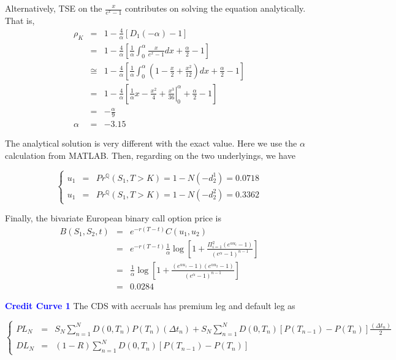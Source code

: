 \documentclass[a4paper,11pt] {article}
\begin{document}
Alternatively, TSE on the $\frac{x}{e^x-1}$ contributes on solving the equation analytically. That is,
\begin{eqnarray*}
\rho_K &=& 1-\frac{4}{\alpha}[D_1(-\alpha)-1]  \\
       &=& 1 - \frac{4}{\alpha}\left[\frac{1}{\alpha} \int_0^\alpha \frac{x}{e^x-1}dx + \frac{\alpha}{2}-1\right]  \\
       &\cong& 1 - \frac{4}{\alpha}\left[\frac{1}{\alpha} \int_0^\alpha (1-\frac{x}{2}+\frac{x^2}{12}) dx + \frac{\alpha}{2}-1\right]  \\
       &=& 1 - \frac{4}{\alpha}\left[\frac{1}{\alpha} \left. x-\frac{x^2}{4} + \frac{x^3}{36} \right|_0^{\alpha} + \frac{\alpha}{2}-1 \right] \\
       &=& -\frac{\alpha}{9} \\
\alpha &=& -3.15
\end{eqnarray*}

The analytical solution is very different with the exact value. Here we use the $\alpha$ calculation from MATLAB. Then, regarding on the two underlyings, we have

$$ \left\{
\begin{aligned}
u_1 &=& Pr^{\mathbb{Q}}(S_1,T>K) = 1 - N(-d_2^1) = 0.0718 \\
u_1 &=& Pr^{\mathbb{Q}}(S_1,T>K) = 1 - N(-d_2^2) = 0.3362
\end{aligned}
\right.
$$

Finally, the bivariate European binary call option price is
\begin{eqnarray*}
B(S_1,S_2,t) &=& e^{-r(T-t)} C(u_1, u_2) \\
             &=& e^{-r(T-t)} \frac{1}{\alpha} \log\left[ 1+ \frac{\Pi_{i=1}^2 (e^{\alpha u_i}-1)}{(e^{\alpha}-1)^{n-1}} \right] \\
             &=& \frac{1}{\alpha} \log\left[ 1+ \frac{ (e^{\alpha u_1}-1)(e^{\alpha u_2}-1)}{(e^{\alpha}-1)^{n-1}} \right] \\
             &=& 0.0284
\end{eqnarray*}

\bigskip

\textcolor{blue}{\bf Credit Curve 1} The CDS with accruals has premium leg and default leg as

$$ \left\{
\begin{aligned}
PL_N &=& S_N \sum_{n=1}^N D(0,T_n)P(T_n)(\Delta t_n) + S_N \sum_{n=1}^N D(0,T_n)[P(T_{n-1})-P(T_n)]\frac{(\Delta t_n)}{2} \\
DL_N &=& (1-R) \sum_{n=1}^N D(0,T_n)[P(T_{n-1})-P(T_n)]
\end{aligned}
\right.
$$
\end{document}
